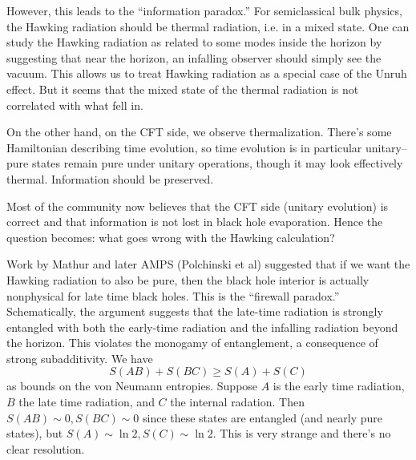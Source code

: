 However, this leads to the ``information paradox.'' For semiclassical bulk physics, the Hawking radiation should be thermal radiation, i.e. in a mixed state. One can study the Hawking radiation as related to some modes inside the horizon by suggesting that near the horizon, an infalling observer should simply see the vacuum. This allows us to treat Hawking radiation as a special case of the Unruh effect. But it seems that the mixed state of the thermal radiation is not correlated with what fell in.

On the other hand, on the CFT side, we observe thermalization. There's some Hamiltonian describing time evolution, so time evolution is in particular unitary-- pure states remain pure under unitary operations, though it may look effectively thermal. Information should be preserved.

Most of the community now believes that the CFT side (unitary evolution) is correct and that information is not lost in black hole evaporation. Hence the question becomes: what goes wrong with the Hawking calculation?

Work by Mathur and later AMPS (Polchinski et al) suggested that if we want the Hawking radiation to also be pure, then the black hole interior is actually nonphysical for late time black holes. This is the ``firewall paradox.'' Schematically, the argument suggests that the late-time radiation is strongly entangled with both the early-time radiation and the infalling radiation beyond the horizon. This violates the monogamy of entanglement, a consequence of strong subadditivity.
We have
\begin{equation}
    S(AB)+ S(BC) \geq S(A)+ S(C)
\end{equation}
as bounds on the von Neumann entropies. Suppose $A$ is the early time radiation, $B$ the late time radiation, and $C$ the internal radation. Then $S(AB)\sim 0, S(BC)\sim 0$ since these states are entangled (and nearly pure states), but $S(A)\sim \ln 2, S(C)\sim \ln 2$. This is very strange and there's no clear resolution.